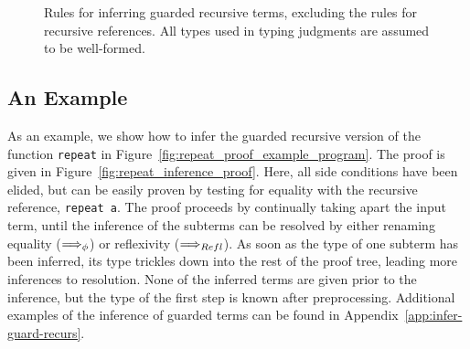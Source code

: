 \begin{figure}[H]
\centering
\ContinuedFloat
{}

\end{figure}
\begin{figure}[H]
\centering
\ContinuedFloat
{}

\end{figure}
\begin{figure}[H]
\centering
\ContinuedFloat
{}
\end{figure}
\begin{figure}[H]
\centering
\ContinuedFloat
{}
{}
  
  \caption{Rules for inferring guarded recursive terms, excluding the rules for
    recursive references. All types used in typing judgments are assumed to be
    well-formed.}
  \label{fig:epsilon_rec_causal}
\label{fig:epsilon_rules}
\end{figure}

\subsection{An Example}
As an example, we show how to infer the guarded recursive version of the
function \texttt{repeat} in Figure~\ref{fig:repeat_proof_example_program}. The
proof is given in Figure~\ref{fig:repeat_inference_proof}. Here, all side
conditions have been elided, but can be easily proven by testing for equality
with the recursive reference, \texttt{repeat a}. The proof proceeds by
continually taking apart the input term, until the inference of the subterms can
be resolved by either renaming equality ($\Longrightarrow_\phi$) or reflexivity
($\Longrightarrow_{Refl}$). As soon as the type of one subterm has been inferred, its
type trickles down into the rest of the proof tree, leading more inferences to
resolution. None of the inferred terms are given prior to the inference, but the
type of the first step is known after preprocessing. Additional examples of the
inference of guarded terms can be found in Appendix~\ref{app:infer-guard-recurs}.

